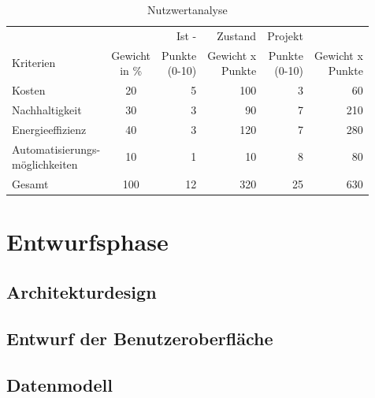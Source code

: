 \documentclass[12pt, ngerman, a4paper,toc=left, parskip=half, numbers=noenddot, headings=standardclasses, nonumberlist]{scrartcl}
\begin{document}
\begin{table}[h]
	\begin{center}
		\begin{tabular}{ l c | r r | r r}
											&				& \cellcolor{red!10!} Ist -	& \cellcolor{red!10!}	Zustand				& \cellcolor{green!10!} Projekt			& \cellcolor{green!10!}		\\
			\rowcolor{blue!10}
			Kriterien 						& \makecell{Gewicht\\in \%} & \makecell{Punkte\\(0-10)} & \makecell{Gewicht x\\Punkte} 	& \makecell{Punkte\\(0-10)} & \makecell{Gewicht x\\Punkte} \\
			\toprule
			Kosten       					& 20       		& 5   			& 100				& 3				&  60  \\
			Nachhaltigkeit 					& 30       		& 3   			&  90				& 7				& 210  \\
			Energieeffizienz 				& 40       		& 3   			& 120				& 7				& 280	\\
			\makecell{Automatisierungs-\\möglichkeiten}   & 10      		& 1     		&  10				& 8 			&  80	\\
			\hline
			\rowcolor{blue!20}
			Gesamt       					& 100      		& 12   			& 320				& 25 			& 630 	\\
		\end{tabular}
	\end{center}
	
	\caption{Nutzwertanalyse}
	\label{table:3}
\end{table}


\newpage
\section{Entwurfsphase}
\subsection{Architekturdesign}

\subsection{Entwurf der Benutzeroberfläche}\label{entwurfui}

\subsection{Datenmodell}
\end{document}
